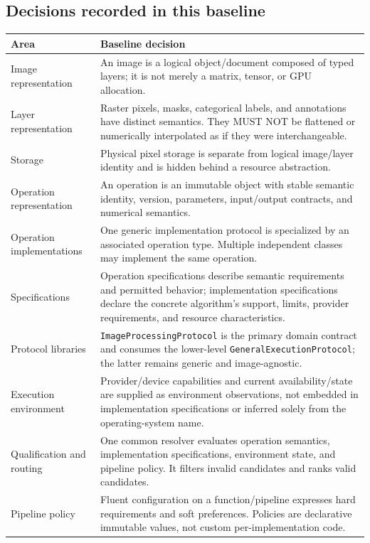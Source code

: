 \documentclass[11pt,a4paper,oneside]{article}
\begin{document}
\subsection{Decisions recorded in this baseline}

\begin{longtable}{@{}L{0.27\textwidth}Z{0.67\textwidth}@{}}
\toprule
\textbf{Area} & \textbf{Baseline decision} \\
\midrule
Image representation & An image is a logical object/document composed of typed layers; it is not merely a matrix, tensor, or GPU allocation. \\
Layer representation & Raster pixels, masks, categorical labels, and annotations have distinct semantics. They MUST NOT be flattened or numerically interpolated as if they were interchangeable. \\
Storage & Physical pixel storage is separate from logical image/layer identity and is hidden behind a resource abstraction. \\
Operation representation & An operation is an immutable object with stable semantic identity, version, parameters, input/output contracts, and numerical semantics. \\
Operation implementations & One generic implementation protocol is specialized by an associated operation type. Multiple independent classes may implement the same operation. \\
Specifications & Operation specifications describe semantic requirements and permitted behavior; implementation specifications declare the concrete algorithm's support, limits, provider requirements, and resource characteristics. \\
Protocol libraries & \texttt{ImageProcessing\allowbreak Protocol} is the primary domain contract and consumes the lower-level \texttt{GeneralExecution\allowbreak Protocol}; the latter remains generic and image-agnostic. \\
Execution environment & Provider/device capabilities and current availability/state are supplied as environment observations, not embedded in implementation specifications or inferred solely from the operating-system name. \\
Qualification and routing & One common resolver evaluates operation semantics, implementation specifications, environment state, and pipeline policy. It filters invalid candidates and ranks valid candidates. \\
Pipeline policy & Fluent configuration on a function/pipeline expresses hard requirements and soft preferences. Policies are declarative immutable values, not custom per-implementation code. \\

\end{longtable}
\end{document}
